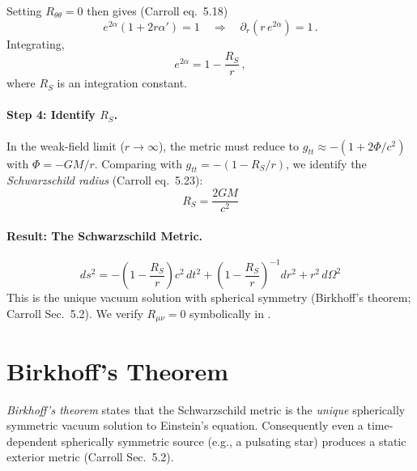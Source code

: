 Setting $R_{\theta\theta} = 0$ then gives (Carroll eq.~5.18)
\begin{equation}
    e^{2\alpha}(1 + 2r\alpha') = 1 \quad\Longrightarrow\quad
    \partial_r(r\, e^{2\alpha}) = 1 \,.
    \label{eq:Rthth_zero}
\end{equation}
Integrating,
\begin{equation}
    e^{2\alpha} = 1 - \frac{R_S}{r} \,,
    \label{eq:e2alpha}
\end{equation}
where $R_S$ is an integration constant.

\paragraph{Step 4: Identify $R_S$.}
In the weak-field limit ($r \to \infty$), the metric must reduce to
$g_{tt} \approx -(1 + 2\Phi/c^2)$ with $\Phi = -GM/r$.  Comparing with
$g_{tt} = -(1 - R_S/r)$, we identify the \emph{Schwarzschild radius}
(Carroll eq.~5.23):
\begin{equation}
    \boxed{R_S = \frac{2GM}{c^2}}
    \label{eq:schwarzschild_radius}
\end{equation}

\paragraph{Result: The Schwarzschild Metric.}
\begin{equation}
    \boxed{
    ds^2 = -\left(1 - \frac{R_S}{r}\right) c^2\, dt^2
    + \left(1 - \frac{R_S}{r}\right)^{-1} dr^2
    + r^2\, d\Omega^2
    }
    \label{eq:schwarzschild_metric}
\end{equation}
This is the unique vacuum solution with spherical symmetry
(Birkhoff's theorem; Carroll Sec.~5.2).  We verify $R_{\mu\nu} = 0$
symbolically in
.


\section{Birkhoff's Theorem}
\label{sec:birkhoff}

\emph{Birkhoff's theorem} states that the Schwarzschild metric is the
\emph{unique} spherically symmetric vacuum solution to Einstein's
equation.  Consequently even a time-dependent
spherically symmetric source (e.g., a pulsating star) produces a
static exterior metric (Carroll Sec.~5.2).

